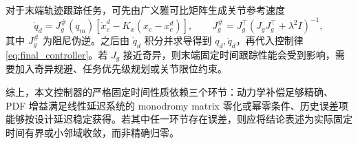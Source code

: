 对于末端轨迹跟踪任务，可先由广义雅可比矩阵生成关节参考速度
\[
\dot q_d=J_g^\#(q_m)[\dot x_e^d-K_x(x_e-x_e^d)],
\qquad
J_g^\#=J_g^\top(J_gJ_g^\top+\lambda^2I)^{-1},
\]
其中 \(J_g^\#\) 为阻尼伪逆。之后由 \(\dot q_d\) 积分并求导得到 \(q_d,\ddot q_d\)，再代入控制律 \eqref{eq:final_controller}。若 \(J_g\) 接近奇异，则末端固定时间跟踪性能会受到影响，需要加入奇异规避、任务优先级规划或关节限位约束。

综上，本文控制器的严格固定时间性质依赖三个环节：动力学补偿足够精确、PDF 增益满足线性延迟系统的 monodromy matrix 零化或幂零条件、历史误差项能够按设计延迟稳定获得。若其中任一环节存在误差，则应将结论表述为实际固定时间有界或小邻域收敛，而非精确归零。
